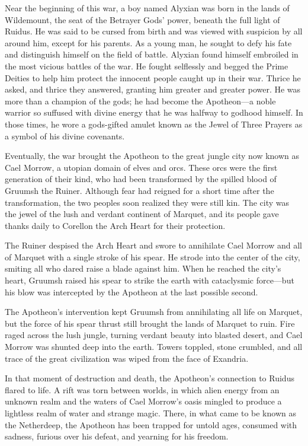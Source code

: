 \documentclass[10pt,a4paper,twoside,bg=print,twocolumn,openany,nodeprecatedcode]{dndbook}
\begin{document}
Near the beginning of this war, a boy named Alyxian was born in the lands of Wildemount, the seat of the Betrayer Gods' power, beneath the full light of Ruidus. He was said to be cursed from birth and was viewed with suspicion by all around him, except for his parents. As a young man, he sought to defy his fate and distinguish himself on the field of battle. Alyxian found himself embroiled in the most vicious battles of the war. He fought selflessly and begged the Prime Deities to help him protect the innocent people caught up in their war. Thrice he asked, and thrice they answered, granting him greater and greater power. He was more than a champion of the gods; he had become the Apotheon—a noble warrior so suffused with divine energy that he was halfway to godhood himself. In those times, he wore a gods-gifted amulet known as the Jewel of Three Prayers as a symbol of his divine covenants.

Eventually, the war brought the Apotheon to the great jungle city now known as Cael Morrow, a utopian domain of elves and orcs. These orcs were the first generation of their kind, who had been transformed by the spilled blood of Gruumsh the Ruiner. Although fear had reigned for a short time after the transformation, the two peoples soon realized they were still kin. The city was the jewel of the lush and verdant continent of Marquet, and its people gave thanks daily to Corellon the Arch Heart for their protection.

The Ruiner despised the Arch Heart and swore to annihilate Cael Morrow and all of Marquet with a single stroke of his spear. He strode into the center of the city, smiting all who dared raise a blade against him. When he reached the city's heart, Gruumsh raised his spear to strike the earth with cataclysmic force—but his blow was intercepted by the Apotheon at the last possible second.

The Apotheon's intervention kept Gruumsh from annihilating all life on Marquet, but the force of his spear thrust still brought the lands of Marquet to ruin. Fire raged across the lush jungle, turning verdant beauty into blasted desert, and Cael Morrow was shunted deep into the earth. Towers toppled, stone crumbled, and all trace of the great civilization was wiped from the face of Exandria.

In that moment of destruction and death, the Apotheon's connection to Ruidus flared to life. A rift was torn between worlds, in which alien energy from an unknown realm and the waters of Cael Morrow's oasis mingled to produce a lightless realm of water and strange magic. There, in what came to be known as the Netherdeep, the Apotheon has been trapped for untold ages, consumed with sadness, furious over his defeat, and yearning for his freedom.
\end{document}
